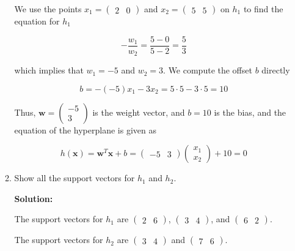 \documentclass[11pt]{article}
\begin{document}
\begin{enumerate}
\begin{enumerate}
We use the points $x_1 = (\begin{array}{cc}2 & 0 \end{array})$ and $x_2 = (\begin{array}{cc}5 & 5 \end{array})$ on $h_1$ to find the equation for $h_1$

\begin{equation*}
-\frac{w_1}{w_2} = \frac{5-0}{5-2} = \frac{5}{3}
\end{equation*}

which implies that $w_1 = -5$ and $w_2 = 3$. We compute the offset $b$ directly

\begin{equation*}
b = - (-5) x_1 - 3 x_2 = 5 \cdot 5 - 3 \cdot 5 = 10
\end{equation*}

Thus, $\mathbf{w} = \left( \begin{array}{c} -5 \\ 3 \end{array} \right)$ is the weight vector, and $b = 10$ is the bias, and the equation of the hyperplane is given as

\begin{equation*}
h(\mathbf{x}) = \mathbf{w}^\mathit{T} \mathbf{x} + b = (\begin{array}{cc} -5 & 3 \end{array}) \left( \begin{array}{c} x_1 \\ x_2 \end{array} \right) + 10 = 0
\end{equation*}

\item Show all the support vectors for $h_1$ and $h_2$.

\textbf{Solution:}

The support vectors for $h_1$ are $(\begin{array}{cc} 2 & 6 \end{array})$, $(\begin{array}{cc} 3 & 4 \end{array})$, and $(\begin{array}{cc} 6 & 2 \end{array})$.

The support vectors for $h_2$ are $(\begin{array}{cc} 3 & 4 \end{array})$ and $(\begin{array}{cc} 7 & 6 \end{array})$.


\end{enumerate}
\end{enumerate}
\end{document}
